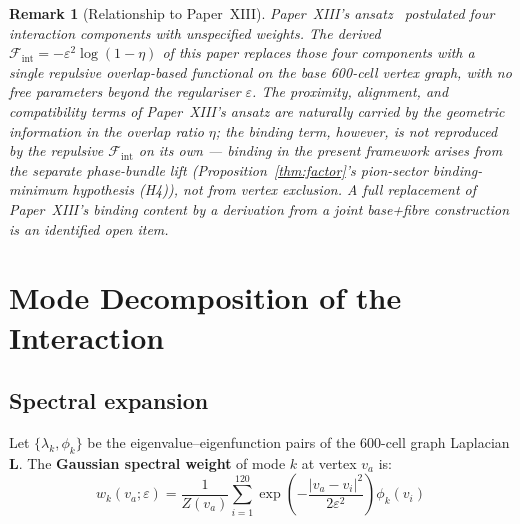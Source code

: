 \documentclass[12pt]{article}
\newtheorem{remark}[theorem]{Remark}
\newcommand{\Fcal}{\mathcal{F}}
\newcommand{\Fint}{\Fcal_{\mathrm{int}}}
\begin{document}
\begin{remark}[Relationship to Paper~XIII]
Paper~XIII's ansatz~\citep{SmartXIII} postulated four interaction
components with unspecified weights. The derived $\Fint = -\varepsilon^2\log(1-\eta)$ of this paper replaces those four components with a single repulsive overlap-based functional on the base 600-cell vertex graph, with no free parameters beyond the regulariser $\varepsilon$. The proximity, alignment, and compatibility terms of Paper~XIII's ansatz are naturally carried by the geometric information in the overlap ratio $\eta$; the binding term, however, is \emph{not} reproduced by the repulsive $\Fint$ on its own --- binding in the present framework arises from the separate phase-bundle lift (Proposition~\ref{thm:factor}'s pion-sector binding-minimum hypothesis (H4)), not from vertex exclusion. A full replacement of Paper~XIII's binding content by a derivation from a joint base+fibre construction is an identified open item.
\end{remark}

\section{Mode Decomposition of the Interaction}\label{sec:modes}

\subsection{Spectral expansion}

Let $\{\lambda_k, \phi_k\}$ be the eigenvalue--eigenfunction pairs of
the 600-cell graph Laplacian $\mathbf{L}$. The \textbf{Gaussian
spectral weight} of mode $k$ at vertex $v_a$ is:
\begin{equation}\label{eq:wk}
    w_k(v_a;\varepsilon) = \frac{1}{Z(v_a)}\sum_{i=1}^{120}
    \exp\!\left(-\frac{|v_a - v_i|^2}{2\varepsilon^2}\right)\phi_k(v_i)
\end{equation}
\end{document}
